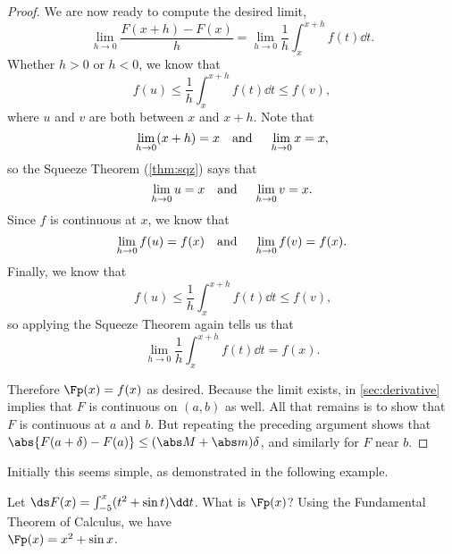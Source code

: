 \begin{proof}
We are now ready to compute the desired limit,
\[\lim_{h\to 0}\frac{F(x+h)-F(x)}{h}=\lim_{h\to 0}\frac1h\int_x^{x+h} f(t)\dd t.\]
Whether $h>0$ or $h<0$, we know that
\[f(u)\leq \frac1h\int_x^{x+h} f(t)\dd t\leq f(v),\]
where $u$ and $v$ are both between $x$ and $x+h$. Note that 
\[\lim_{h\to 0} (x+h)=x \text{\quad and \quad} \lim_{h\to 0} x=x,\]
so the Squeeze Theorem (\autoref{thm:sqz}) says that
\[\lim_{h\to 0}u=x \text{\quad and \quad} \lim_{h\to 0} v=x.\]
Since $f$ is continuous at $x$, we know that
\[\lim_{h\to 0} f(u)=f(x)\text{\quad and \quad} \lim_{h\to 0}f(v)=f(x).\]
Finally, we know that
\[f(u)\leq \frac1h \int_x^{x+h} f(t)\dd t\leq f(v)\text{,}\]
so applying the Squeeze Theorem again tells us that
\[\lim_{h\to 0}\frac1h\int_x^{x+h} f(t)\dd t=f(x).\] 

Therefore $\Fp(x)=f(x)$ as desired.  Because the limit exists,  in \autoref{sec:derivative} implies that $F$ is continuous on $(a,b)$ as well. All that remains is to show that $F$ is continuous at $a$ and $b$.  But repeating the preceding argument shows that $\abs{F(a+\delta)-F(a)}\le(\abs M+\abs m)\delta$, and similarly for $F$ near $b$.%
\end{proof}


Initially this seems simple, as demonstrated in the following example.

\begin{example}\label{ex_ftc2}%
Let $\ds F(x) = \int_{-5}^x (t^2+\sin t)\dd t$. What is $\Fp(x)$?
\solution
Using the Fundamental Theorem of Calculus, we have\\
$\Fp(x) = x^2+\sin x$.
\end{example}

